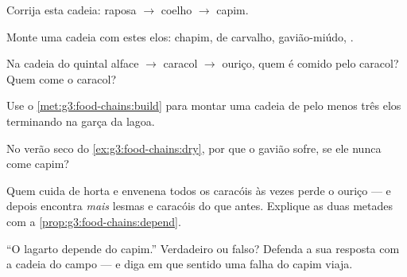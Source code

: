 \begin{exercise}[$\star$]\label{exo:g3:food-chains:4}
Corrija esta cadeia: raposa $\rightarrow$ coelho $\rightarrow$
capim.
\end{exercise}

\begin{exercise}[$\star$]\label{exo:g3:food-chains:5}
Monte uma cadeia com estes elos: chapim,  de carvalho,
gavião-miúdo, .
\end{exercise}

\begin{exercise}[$\star$]\label{exo:g3:food-chains:6}
Na cadeia do quintal alface $\rightarrow$ caracol $\rightarrow$
ouriço, quem é comido pelo caracol? Quem come o caracol?
\end{exercise}

\begin{exercise}[$\star$]\label{exo:g3:food-chains:7}
Use o \cref{met:g3:food-chains:build} para montar uma cadeia de pelo
menos três elos terminando na garça da lagoa.
\end{exercise}

\begin{exercise}[$\star$]\label{exo:g3:food-chains:8}
No verão seco do \cref{ex:g3:food-chains:dry}, por que o gavião
sofre, se ele nunca come capim?
\end{exercise}

\begin{exercise}[$\star\star$]\label{exo:g3:food-chains:9}
Quem cuida de horta e envenena todos os caracóis às vezes perde o
ouriço --- e depois encontra \emph{mais} lesmas e caracóis do que
antes. Explique as duas metades com a
\cref{prop:g3:food-chains:depend}.
\end{exercise}

\begin{exercise}[$\star\star$]\label{exo:g3:food-chains:10}
``O lagarto depende do capim.'' Verdadeiro ou falso? Defenda a sua
resposta com a cadeia do campo --- e diga em que sentido uma falha
do capim viaja.
\end{exercise}
